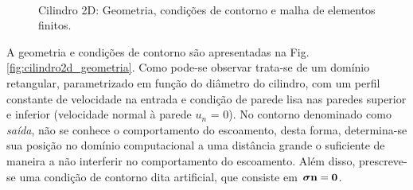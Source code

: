 \documentclass[tese_patricia]{subfiles}%
\begin{document}
\begin{figure}[!htb]
	\centering
	\\
	\caption{Cilindro 2D: Geometria, condições de contorno e malha de elementos finitos.}
\end{figure}


A geometria e condições de contorno são apresentadas na Fig. \ref{fig:cilindro2d_geometria}. Como pode-se observar trata-se de um domínio retangular, parametrizado em função do diâmetro do cilindro, com um perfil constante de velocidade na entrada e condição de parede lisa nas paredes superior e inferior (velocidade normal à parede $u_{n}$ = 0). No contorno denominado como \textit{saída}, não se conhece o comportamento do escoamento, desta forma, determina-se sua posição no domínio computacional a uma distância grande o suficiente de maneira a não interferir no comportamento do escoamento. Além disso, prescreve-se uma condição de contorno dita artificial, que consiste em $\boldsymbol{\sigma} \mathbf{n} = \mathbf{0}$.
\end{document}
